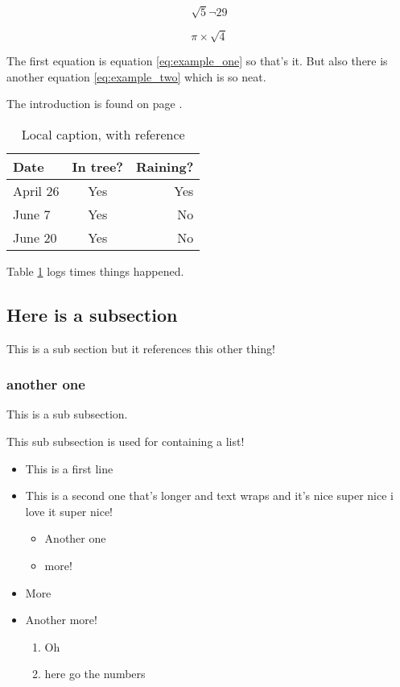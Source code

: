 $$ \sqrt{5} \neg 29 $$

\begin{equation} \label{eq:example_two}
    \pi \times \sqrt{4}
\end{equation}


The first equation is equation \ref{eq:example_one} so that's it. But also
there is another equation \ref{eq:example_two} which is so neat.

The introduction is found on page \pageref{sec:intro}.

\begin{table}[H]
    \centering
    \caption[This is optional caption, without reference]{Local caption, with
        reference \cite{ricardo}
    }
    \begin{tabular}{l c r} %
        Date     & In tree? & Raining? \\ \hline
        April 26 & Yes      & Yes      \\
        June 7   & Yes      & No       \\
        June 20  & Yes      & No       \\
    \end{tabular}
    \label{tab:example_table}

\end{table}

Table \ref{tab:example_table} logs times things happened.

\subsection{Here is a subsection}
This is a sub section but it references this other thing!

\subsubsection{another one}
This is a sub subsection.

This sub subsection is used for containing a list!

\begin{itemize}
    \item This is a first line
    \item This is a second one that's longer and text wraps and it's nice super
          nice i love it super nice!
          \begin{itemize}
              \item Another one
              \item more!
          \end{itemize}
    \item More
    \item Another more!
          \begin{enumerate}
              \item Oh
              \item here go the numbers
          \end{enumerate}
\end{itemize}
\cleardoublepage
